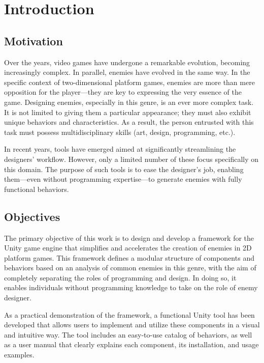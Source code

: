 \chapter*{Introduction}
\label{cap:introduction}


\section*{Motivation}
Over the years, video games have undergone a remarkable evolution, becoming increasingly complex. In parallel, enemies have evolved in the same way. In the specific context of two-dimensional platform games, enemies are more than mere opposition for the player—they are key to expressing the very essence of the game. Designing enemies, especially in this genre, is an ever more complex task. It is not limited to giving them a particular appearance; they must also exhibit unique behaviors and characteristics. As a result, the person entrusted with this task must possess multidisciplinary skills (art, design, programming, etc.).

In recent years, tools have emerged aimed at significantly streamlining the designers’ workflow. However, only a limited number of these focus specifically on this domain. The purpose of such tools is to ease the designer’s job, enabling them—even without programming expertise—to generate enemies with fully functional behaviors.

\section*{Objectives}
The primary objective of this work is to design and develop a framework for the Unity game engine that simplifies and accelerates the creation of enemies in 2D platform games. This framework defines a modular structure of components and behaviors based on an analysis of common enemies in this genre, with the aim of completely separating the roles of programming and design. In doing so, it enables individuals without programming knowledge to take on the role of enemy designer.

As a practical demonstration of the framework, a functional Unity tool has been developed that allows users to implement and utilize these components in a visual and intuitive way. The tool includes an easy-to-use catalog of behaviors, as well as a user manual that clearly explains each component, its installation, and usage examples.

